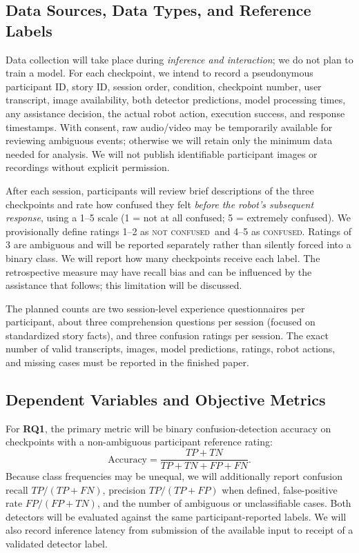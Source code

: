 \documentclass[conference]{IEEEtran}
\newcommand{\confused}{\textsc{confused}}
\newcommand{\notconfused}{\textsc{not confused}}
\begin{document}
\subsection{Data Sources, Data Types, and Reference Labels}
Data collection will take place during \emph{inference and interaction}; we do not plan to train a model. For each checkpoint, we intend to record a pseudonymous participant ID, story ID, session order, condition, checkpoint number, user transcript, image availability, both detector predictions, model processing times, any assistance decision, the actual robot action, execution success, and response timestamps. With consent, raw audio/video may be temporarily available for reviewing ambiguous events; otherwise we will retain only the minimum data needed for analysis. We will not publish identifiable participant images or recordings without explicit permission.

After each session, participants will review brief descriptions of the three checkpoints and rate how confused they felt \emph{before the robot's subsequent response}, using a 1--5 scale (1 = not at all confused; 5 = extremely confused). We provisionally define ratings 1--2 as \notconfused\ and 4--5 as \confused. Ratings of 3 are ambiguous and will be reported separately rather than silently forced into a binary class. We will report how many checkpoints receive each label. The retrospective measure may have recall bias and can be influenced by the assistance that follows; this limitation will be discussed.

The planned counts are two session-level experience questionnaires per participant, about three comprehension questions per session (focused on standardized story facts), and three confusion ratings per session. The exact number of valid transcripts, images, model predictions, ratings, robot actions, and missing cases must be reported in the finished paper.

\subsection{Dependent Variables and Objective Metrics}
For \textbf{RQ1}, the primary metric will be binary confusion-detection accuracy on checkpoints with a non-ambiguous participant reference rating:
\begin{equation}
\mathrm{Accuracy} = \frac{TP+TN}{TP+TN+FP+FN}.
\end{equation}
Because class frequencies may be unequal, we will additionally report confusion recall $TP/(TP+FN)$, precision $TP/(TP+FP)$ when defined, false-positive rate $FP/(FP+TN)$, and the number of ambiguous or unclassifiable cases. Both detectors will be evaluated against the same participant-reported labels. We will also record inference latency from submission of the available input to receipt of a validated detector label.
\end{document}
